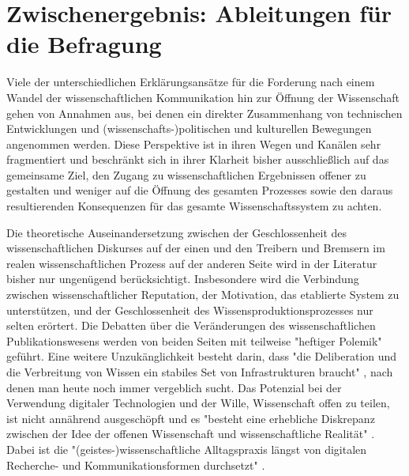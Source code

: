 \section{Zwischenergebnis: Ableitungen für die Befragung}

Viele der unterschiedlichen Erklärungsansätze für die Forderung nach einem Wandel der wissenschaftlichen Kommunikation hin zur Öffnung der Wissenschaft gehen von Annahmen aus, bei denen ein direkter Zusammenhang von technischen Entwicklungen und (wissenschafts-)politischen und kulturellen Bewegungen angenommen werden. Diese Perspektive ist in ihren Wegen und Kanälen sehr fragmentiert und beschränkt sich in ihrer Klarheit bisher ausschließlich auf das gemeinsame Ziel, den Zugang zu wissenschaftlichen Ergebnissen offener zu gestalten und weniger auf die Öffnung des gesamten Prozesses sowie den daraus resultierenden Konsequenzen für das gesamte Wissenschaftssystem zu achten.

Die theoretische Auseinandersetzung zwischen der Geschlossenheit des wissenschaftlichen Diskurses auf der einen und den Treibern und Bremsern im realen wissenschaftlichen Prozess auf der anderen Seite wird in der Literatur bisher nur ungenügend berücksichtigt. Insbesondere wird die Verbindung zwischen wissenschaftlicher Reputation, der Motivation, das etablierte System zu unterstützen, und der Geschlossenheit des Wissensproduktionsprozesses nur selten erörtert. Die Debatten über die Veränderungen des wissenschaftlichen Publikationswesens werden von beiden Seiten mit teilweise "heftiger Polemik" \cite[:12]{Naeder_2010} geführt. Eine weitere Unzukänglichkeit besteht darin, dass "die Deliberation und die Verbreitung von Wissen ein stabiles Set von Infrastrukturen braucht" \cite{Kelty_2004}, nach denen man heute noch immer vergeblich sucht. Das Potenzial bei der Verwendung digitaler Technologien und der Wille, Wissenschaft offen zu teilen, ist nicht annährend ausgeschöpft und es "besteht eine erhebliche Diskrepanz zwischen der Idee der offenen Wissenschaft und wissenschaftliche Realität" \cite{Scheliga_2014}. Dabei ist die "(geistes-)wissenschaftliche Alltagspraxis längst von digitalen Recherche- und Kommunikationsformen durchsetzt" \cite{Hagner_2015}.

